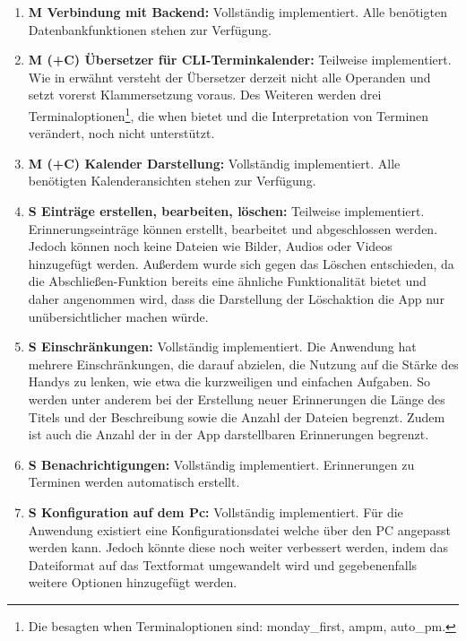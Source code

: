 \begin{enumerate}%
	\item \textbf{M Verbindung mit Backend:} %
		Vollständig implementiert. Alle benötigten Datenbankfunktionen stehen zur Verfügung.%
	\item \textbf{M (+C) Übersetzer für CLI-Terminkalender:} %
		Teilweise implementiert. Wie in  erwähnt versteht der Übersetzer derzeit nicht alle Operanden und setzt vorerst Klammersetzung voraus. Des Weiteren werden drei Terminaloptionen\footnote{Die besagten when Terminaloptionen sind: monday\_first, ampm, auto\_pm\cite{cli_when}.}, die \glqq when\grqq{} bietet und die Interpretation von Terminen verändert, noch nicht unterstützt.%
	\item \textbf{M (+C) Kalender Darstellung:} %
		Vollständig implementiert. Alle benötigten Kalenderansichten stehen zur Verfügung. %
	\item \textbf{S Einträge erstellen, bearbeiten, löschen:} %
		Teilweise implementiert. Erinnerungseinträge können erstellt, bearbeitet und abgeschlossen werden. Jedoch können noch keine Dateien wie Bilder, Audios oder Videos hinzugefügt werden.\newline
		Außerdem wurde sich gegen das Löschen entschieden, da die Abschließen-Funktion bereits eine ähnliche Funktionalität bietet und daher angenommen wird, dass die Darstellung der Löschaktion die App nur unübersichtlicher machen würde.
	\item \textbf{S Einschränkungen:} %
		Vollständig implementiert. Die Anwendung hat mehrere Einschränkungen, die darauf abzielen, die Nutzung auf die Stärke des Handys zu lenken, wie etwa die kurzweiligen und einfachen Aufgaben. %
		So werden unter anderem bei der Erstellung neuer Erinnerungen die Länge des Titels und der Beschreibung sowie die Anzahl der Dateien begrenzt. Zudem ist auch die Anzahl der in der App darstellbaren Erinnerungen begrenzt.%
	\item \textbf{S Benachrichtigungen:} %
		Vollständig implementiert. Erinnerungen zu Terminen werden automatisch erstellt.%
	\item \textbf{S Konfiguration auf dem Pc:}
		Vollständig implementiert. Für die Anwendung existiert eine Konfigurationsdatei welche über den PC angepasst werden kann. %
		Jedoch könnte diese noch weiter verbessert werden, indem das Dateiformat auf das Textformat umgewandelt wird und gegebenenfalls weitere Optionen hinzugefügt werden.%

\end{enumerate}
